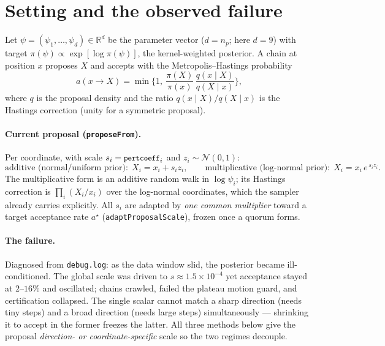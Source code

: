 \documentclass[11pt]{article}
\newcommand{\code}[1]{\texttt{\small #1}}
\newcommand{\pc}{\code{pertcoeff}}
\begin{document}
\section{Setting and the observed failure}

Let $\psi=(\psi_1,\dots,\psi_d)\in\mathbb R^{d}$ be the parameter vector
($d=n_p$; here $d=9$) with target $\pi(\psi)\propto\exp[\log\pi(\psi)]$,
the kernel-weighted posterior. A chain at position $x$ proposes $X$ and
accepts with the Metropolis--Hastings probability
\begin{equation}
  a(x\to X) = \min\!\Big\{1,\ \frac{\pi(X)}{\pi(x)}\,
  \frac{q(x\mid X)}{q(X\mid x)}\Big\},
  \label{eq:mh}
\end{equation}
where $q$ is the proposal density and the ratio $q(x\mid X)/q(X\mid x)$ is
the Hastings correction (unity for a symmetric proposal).

\paragraph{Current proposal (\code{proposeFrom}).} Per coordinate, with
scale $s_i=\pc_i$ and $z_i\sim\mathcal N(0,1)$:
\begin{equation}
  \text{additive (normal/uniform prior):}\ \ X_i = x_i + s_i z_i,
  \qquad
  \text{multiplicative (log-normal prior):}\ \ X_i = x_i\,e^{\,s_i z_i}.
  \label{eq:current}
\end{equation}
The multiplicative form is an additive random walk in $\log\psi_i$; its
Hastings correction is $\prod_i (X_i/x_i)$ over the log-normal
coordinates, which the sampler already carries explicitly. All $s_i$ are
adapted by \emph{one common multiplier} toward a target acceptance rate
$a^\star$ (\code{adaptProposalScale}), frozen once a quorum forms.

\paragraph{The failure.} Diagnosed from \code{debug.log}: as the data
window slid, the posterior became ill-conditioned. The global scale was
driven to $s\!\approx\!1.5\times10^{-4}$ yet acceptance stayed at
$2$--$16\%$ and oscillated; chains crawled, failed the plateau motion
guard, and certification collapsed. The single scalar cannot match a
sharp direction (needs tiny steps) and a broad direction (needs large
steps) simultaneously --- shrinking it to accept in the former freezes
the latter. All three methods below give the proposal \emph{direction- or
coordinate-specific} scale so the two regimes decouple.
\end{document}
